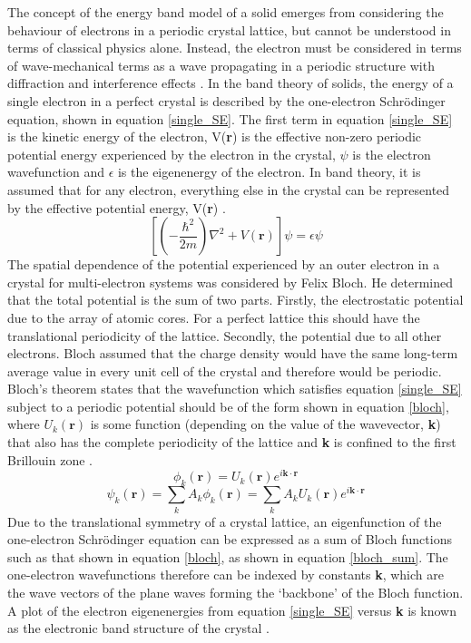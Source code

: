 The concept of the energy band model of a solid emerges from considering the behaviour of electrons in a periodic crystal lattice, but cannot be understood in terms of classical physics alone. Instead, the electron must be considered in terms of wave-mechanical terms as a wave propagating in a periodic structure with diffraction and interference effects  \cite{small_semiconductor1}.
In the band theory of 
solids, the energy of a single electron in a perfect crystal is described by the one-electron Schr{\"o}dinger equation, shown in equation \ref{single_SE}. The first term in equation \ref{single_SE} is the kinetic 
energy of the electron, V(\textbf{r}) is the effective non-zero periodic potential energy experienced by 
the electron in the crystal, $\psi$ is the electron wavefunction and  $\epsilon$ is the eigenenergy of the electron. In band theory, it is assumed that for any electron, everything else in the crystal can be represented by the effective potential energy, V(\textbf{r}) \cite{Blakemore2}.
\begin{equation} \label{single_SE}
\left[ \left(-\frac{\hbar^2}{2m}\right)\nabla^2 + V(\mathbf{r})\right]\psi = \epsilon \psi 
\end{equation}
The spatial dependence of the potential experienced by an outer electron in a crystal for multi-electron systems was considered by Felix Bloch. He determined that the total potential is the sum of two parts. Firstly, the electrostatic potential due to the array of atomic cores. For a perfect lattice this should have the translational periodicity of the lattice. Secondly, the potential due to all other electrons. Bloch assumed that the charge density would have the same long-term average value in every unit cell of the crystal and therefore would be periodic. Bloch's theorem states that the wavefunction which satisfies equation \ref{single_SE} subject to a periodic potential should be of the form shown in equation \ref{bloch}, where $U_k(\mathbf{r})$ is some function 
(depending on the value of the wavevector, \textbf{k}) that also has the complete 
periodicity of the lattice and \textbf{k} is confined to the first Brillouin zone \cite{Blakemore2}.
\begin{equation} \label{bloch}
\phi_k(\mathbf{r}) = U_k(\mathbf{r}) e^{i\mathbf{k \cdot r}} 
\end{equation}
\begin{equation} \label{bloch_sum}
\psi_k(\mathbf{r}) = \sum_k A_k \phi_k(\mathbf{r}) = \sum_k A_kU_k(\mathbf{r}) e^{i\mathbf{k \cdot r}} 
\end{equation}
Due to the translational symmetry of a crystal lattice, an eigenfunction of the one-electron Schr{\"o}dinger equation can be expressed as a sum of Bloch functions such as that shown in equation \ref{bloch}, as shown in equation \ref{bloch_sum}. The one-electron wavefunctions therefore can be indexed by constants \textbf{k}, which are the wave vectors of the plane waves forming the `backbone' of the Bloch function. A plot of the electron eigenenergies from equation \ref{single_SE} versus \textbf{k} is known as the electronic band structure of the crystal \cite{fund_semi}.\\

